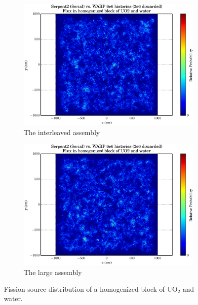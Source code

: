 \begin{figure}[h!]
\centering
\begin{subfigure}{.5\textwidth}
  \centering
  \includegraphics[width=\linewidth]{graphics/finalresults/homfuel_fiss1.eps}
  \caption{The interleaved assembly}
  \label{fig:sub1}
\end{subfigure}%
\begin{subfigure}{.5\textwidth}
  \centering
  \includegraphics[width=\linewidth]{graphics/finalresults/homfuel_fiss2.eps}
  \caption{The large assembly}
  \label{fig:sub2}
\end{subfigure}
\caption{Fission source distribution of a homogenized block of UO$_2$ and water. \label{homfuel_fiss} }
\end{figure}

